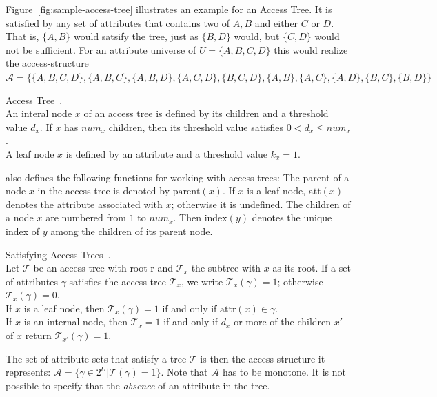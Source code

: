 Figure~\ref{fig:sample-access-tree} illustrates an example for an Access Tree. It is satisfied by any set of attributes that contains two of $A, B$ and either $C$ or $D$.
That is, $\{A,B\}$ would satsify the tree, just as $\{B, D\}$ would, but $\{C, D\}$ would not be sufficient.
For an attribute universe of $U = \{A, B, C, D\}$ this would realize the \gls{access-structure} $\mathcal{A} = \{\{A, B, C, D\}, \{A, B, C\}, \{A, B, D\},\{A, C, D\}, \{B, C, D\}, \{A, B\},\{A, C\},\{A,D\}, \{B, C\},\{B, D\}\}$

\begin{definition}
    Access Tree~\cite{goyal_attribute-based_2006}.\\
    An interal node $x$ of an access tree is defined by its children and a threshold value $d_x$. If $x$ has $num_x$ children, then its threshold value satisfies $0 < d_x \leq num_x$.\\
    A leaf node $x$ is defined by an attribute and a threshold value $k_x = 1$.

    \cite{goyal_attribute-based_2006} also defines the following functions for working with access trees:
    The parent of a node $x$ in the access tree is denoted by $\text{parent}(x)$.
    If $x$ is a leaf node, $\text{att}(x)$ denotes the attribute associated with $x$; otherwise it is undefined.
    The children of a node $x$ are numbered from $1$ to $num_x$. Then $\text{index}(y)$ denotes the unique index of $y$ among the children of its parent node.
\end{definition}

\begin{definition}
    Satisfying Access Trees~\cite{goyal_attribute-based_2006}.\\
    Let $\mathcal{T}$ be an access tree with root r and $\mathcal{T}_x$ the subtree with $x$ as its root.
    If a set of attributes $\gamma$ satisfies the access tree $\mathcal{T}_x$, we write $\mathcal{T}_x(\gamma) = 1$; otherwise $\mathcal{T}_x(\gamma) = 0$.\\
    If $x$ is a leaf node, then $\mathcal{T}_x(\gamma) = 1$ if and only if $\text{attr}(x) \in \gamma$.\\
    If $x$ is an internal node, then $\mathcal{T}_x = 1$ if and only if $d_x$ or more of the children $x'$ of $x$ return $\mathcal{T}_{x'}(\gamma) = 1$.
\end{definition}
The set of attribute sets that satisfy a tree $\mathcal{T}$ is then the access structure it represents: $\mathcal{A} = \{\gamma \in 2^U | \mathcal{T}(\gamma) = 1\}$.
Note that $\mathcal{A}$ has to be monotone. It is not possible to specify that the \emph{absence} of an attribute in the tree.

